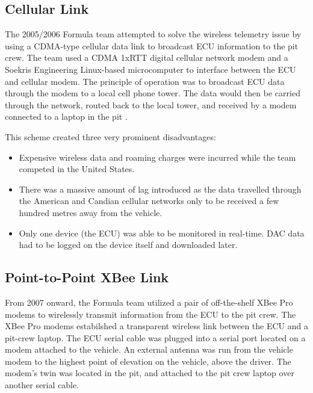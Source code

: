 \subsection{Cellular Link}

The 2005/2006 Formula team attempted to solve the wireless telemetry issue by using a CDMA-type cellular data link to broadcast ECU information to the pit crew. The team used a CDMA 1xRTT digital cellular network modem and a Soekris Engineering Linux-based microcomputer to interface between the ECU and cellular modem. The principle of operation was to broadcast ECU data through the modem to a local cell phone tower. The data would then be carried through the network, routed back to the local tower, and received by a modem connected to a laptop in the pit \cite{G26FinalRepo}.

This scheme created three very prominent disadvantages:

\begin{itemize}

\item Expensive wireless data and roaming charges were incurred while the team competed in the United States. 

\item There was a massive amount of lag introduced as the data travelled through the American and Candian cellular networks only to be received a few hundred metres away from the vehicle.

\item Only one device (the ECU) was able to be monitored in real-time. DAC data had to be logged on the device itself and downloaded later.

\end{itemize}

\subsection{Point-to-Point XBee Link}

From 2007 onward, the Formula team utilized a pair of off-the-shelf XBee Pro modems to wirelessly transmit information from the ECU to the pit crew. The XBee Pro modems estabilshed a transparent wireless link between the ECU and a pit-crew laptop. The ECU serial cable was plugged into a serial port located on a modem attached to the vehicle. An external antenna was run from the vehicle modem to the highest point of elevation on the vehicle, above the driver. The modem's twin was located in the pit, and attached to the pit crew laptop over another serial cable.

